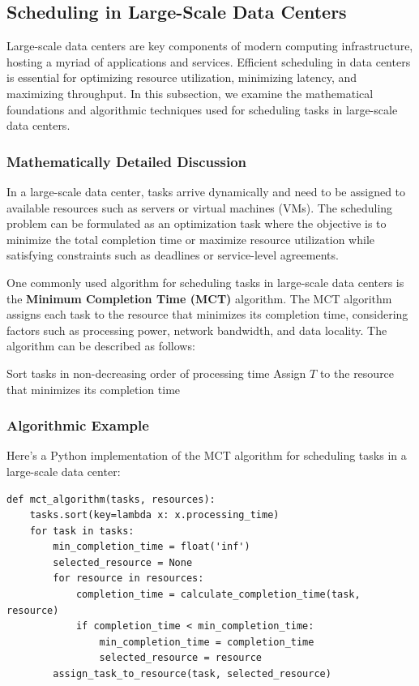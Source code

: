 \documentclass[12pt]{book} %
\begin{document}
\subsection{Scheduling in Large-Scale Data Centers}
Large-scale data centers are key components of modern computing infrastructure, hosting a myriad of applications and services. Efficient scheduling in data centers is essential for optimizing resource utilization, minimizing latency, and maximizing throughput. In this subsection, we examine the mathematical foundations and algorithmic techniques used for scheduling tasks in large-scale data centers.

\subsubsection{Mathematically Detailed Discussion}
In a large-scale data center, tasks arrive dynamically and need to be assigned to available resources such as servers or virtual machines (VMs). The scheduling problem can be formulated as an optimization task where the objective is to minimize the total completion time or maximize resource utilization while satisfying constraints such as deadlines or service-level agreements.

One commonly used algorithm for scheduling tasks in large-scale data centers is the \textbf{Minimum Completion Time (MCT)} algorithm. The MCT algorithm assigns each task to the resource that minimizes its completion time, considering factors such as processing power, network bandwidth, and data locality. The algorithm can be described as follows:
\FloatBarrier
\begin{algorithm}[H]
\caption{Minimum Completion Time (MCT) Algorithm}
\begin{algorithmic}[1]
\State Sort tasks in non-decreasing order of processing time
\State Assign $T$ to the resource that minimizes its completion time
\EndFor
\end{algorithmic}
\end{algorithm}

\subsubsection{Algorithmic Example}
Here's a Python implementation of the MCT algorithm for scheduling tasks in a large-scale data center:
\FloatBarrier
\begin{lstlisting}
def mct_algorithm(tasks, resources):
    tasks.sort(key=lambda x: x.processing_time)
    for task in tasks:
        min_completion_time = float('inf')
        selected_resource = None
        for resource in resources:
            completion_time = calculate_completion_time(task, resource)
            if completion_time < min_completion_time:
                min_completion_time = completion_time
                selected_resource = resource
        assign_task_to_resource(task, selected_resource)
\end{lstlisting}
\FloatBarrier
\end{document}
